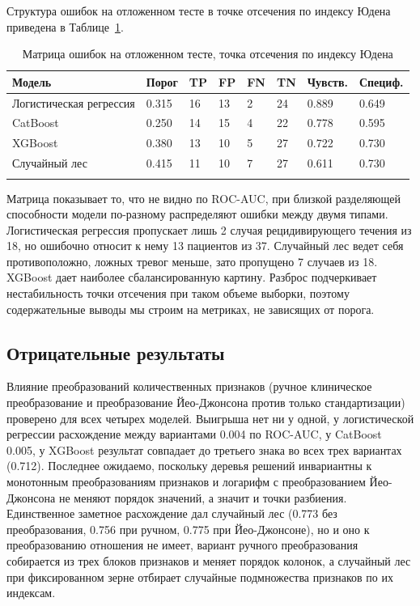 \documentclass[pdflatex,sn-basic,Numbered]{sn-jnl}
\begin{document}
Структура ошибок на отложенном тесте в точке отсечения по индексу Юдена приведена в Таблице~\ref{tab5}.

\begin{table}[h]
\caption{Матрица ошибок на отложенном тесте, точка отсечения по индексу Юдена}\label{tab5}%
\begin{tabular}{@{}llllllll@{}}
\toprule
Модель & Порог & TP & FP & FN & TN & Чувств. & Специф.\\
\midrule
Логистическая регрессия & 0.315 & 16 & 13 & 2 & 24 & 0.889 & 0.649\\
CatBoost & 0.250 & 14 & 15 & 4 & 22 & 0.778 & 0.595\\
XGBoost & 0.380 & 13 & 10 & 5 & 27 & 0.722 & 0.730\\
Случайный лес & 0.415 & 11 & 10 & 7 & 27 & 0.611 & 0.730\\
\botrule
\end{tabular}
\end{table}

Матрица показывает то, что не видно по ROC-AUC, при близкой разделяющей способности модели по-разному распределяют ошибки между двумя типами. Логистическая регрессия пропускает лишь 2 случая рецидивирующего течения из 18, но ошибочно относит к нему 13 пациентов из 37. Случайный лес ведет себя противоположно, ложных тревог меньше, зато пропущено 7 случаев из 18. XGBoost дает наиболее сбалансированную картину. Разброс подчеркивает нестабильность точки отсечения при таком объеме выборки, поэтому содержательные выводы мы строим на метриках, не зависящих от порога.

\subsection{Отрицательные результаты}\label{subsec3_6}

Влияние преобразований количественных признаков (ручное клиническое преобразование и преобразование Йео-Джонсона против только стандартизации) проверено для всех четырех моделей. Выигрыша нет ни у одной, у логистической регрессии расхождение между вариантами 0.004 по ROC-AUC, у CatBoost 0.005, у XGBoost результат совпадает до третьего знака во всех трех вариантах (0.712). Последнее ожидаемо, поскольку деревья решений инвариантны к монотонным преобразованиям признаков и логарифм с преобразованием Йео-Джонсона не меняют порядок значений, а значит и точки разбиения. Единственное заметное расхождение дал случайный лес (0.773 без преобразования, 0.756 при ручном, 0.775 при Йео-Джонсоне), но и оно к преобразованию отношения не имеет, вариант ручного преобразования собирается из трех блоков признаков и меняет порядок колонок, а случайный лес при фиксированном зерне отбирает случайные подмножества признаков по их индексам.
\end{document}
